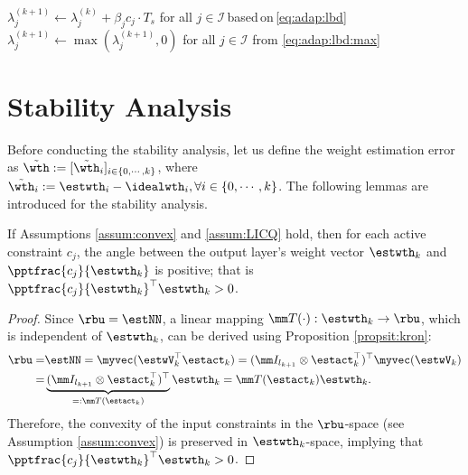\documentclass[letterpaper, journal]{IEEEtran}
\begin{document}
\begin{algorithm}[!t]
\begin{algorithmic}[1]
            \STATE $\lambda_j^{(k+1)}
            \leftarrow
            \lambda_j^{(k)}
            +
            \beta_j c_j\cdot T_s$ for all $j\in\mathcal{I}$\,based\,on\,\eqref{eq:adap:lbd} 
            \STATE $\lambda_j^{(k+1)} \leftarrow \max(\lambda_j^{(k+1)},0)$ for all $j\in\mathcal{I}$ from \eqref{eq:adap:lbd:max} 

        \ENDFOR
    \end{algorithmic}
\end{algorithm}


\section{Stability Analysis}\label{sec:stability}

Before conducting the stability analysis, let us define the weight estimation error as $\tilde\wth:= [\tilde\wth_i]_{i\in\{0,\cdots,k\}}$, where $\tilde\wth_i:=\estwth_i-\idealwth_i, \forall i\in\{0,\cdots,k\}$.
The following lemmas are introduced for the stability analysis. 

\begin{lem}
    If Assumptions \ref{assum:convex} and \ref{assum:LICQ} hold, then for each active constraint $c_j$, the angle between the output layer's weight vector $\estwth_k$ and $\pptfrac{c_j}{\estwth_k}$ is positive; that is $\pptfrac{c_j}{\estwth_k}^\top\estwth_k>0$.
    \label{lem:convex:angle}
\end{lem}

\begin{proof}

Since $\rbu = \estNN$, a linear mapping $\mm T(\cdot):\estwth_k\to\rbu$, which is independent of $\estwth_k$, can be derived using Proposition \ref{propsit:kron}:
\begin{equation}\label{eq:linear:map}
    \begin{aligned}
    \rbu 
    = 
    &
    \estNN 
    =
    \myvec(
        \estwV_k^\top \estact_k
    ) 
    = 
    (
        \mm I_{l_{k+1}}
        \otimes 
        \estact_k^\top
    )^\top
    \myvec(\estwV_k)
    \\
    = &
    \underbrace{
        (
        \mm I_{l_{k+1}}
        \otimes 
        \estact_k^\top
    )^\top}_{=:\mm T(\estact_k)}
    \estwth_k 
    =
    \mm T(\estact_k) \estwth_k.
    \end{aligned}
\end{equation}
Therefore, the convexity of the input constraints in the $\rbu$-space (see Assumption \ref{assum:convex}) is preserved in $\estwth_k$-space, implying
that $\pptfrac{c_j}{\estwth_k}^\top\estwth_k>0$.

\end{proof}
\end{document}
